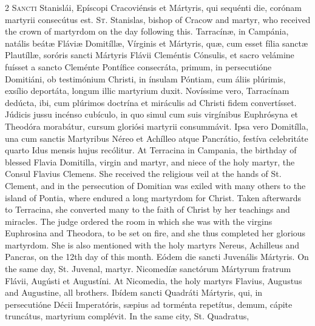 \begin{paracol}{2}
\lettrine[lines=2]{S}{ancti} Stanislái, 
 Epíscopi Cracoviénsis et Mártyris, qui sequénti die, corónam martyrii 
 consecútus est.
\switchcolumn
{}
\lettrine[lines=2]{S}{t.} Stanislas, bishop of Cracow 
 and martyr, who received the crown of martyrdom on the day following this.
\switchcolumn*
{}
Tarracínæ, in Campánia, 
 natális beátæ Fláviæ Domitíllæ, Vírginis et Mártyris, quæ, cum esset fília 
 sanctæ Plautíllæ, soróris sancti Mártyris Flávii Cleméntis Cónsulis, et 
 sacro velámine fuísset a sancto Cleménte Pontífice consecráta, primum, in 
 persecutióne Domitiáni, ob testimónium Christi, in ínsulam Póntiam, cum 
 áliis plúrimis, exsílio deportáta, longum illic martyrium duxit. 
 Novíssime vero, Tarracínam dedúcta, ibi, cum plúrimos doctrína et miráculis 
 ad Christi fidem convertísset. Júdicis jussu incénso cubículo, in quo 
 simul cum suis virgínibus Euphrósyna et Theodóra morabátur, cursum gloriósi 
 martyrii consummávit. Ipsa vero Domitílla, una cum sanctis Martyribus 
 Néreo et Achílleo atque Pancrátio, festíva celebritáte quarto Idus mensis 
 hujus recólitur.
\switchcolumn
{}
At Terracina in Campania, the 
 birthday of blessed Flavia Domitilla, virgin and martyr, and niece of the 
 holy martyr, the Consul Flavius Clemens. She received the religious 
 veil at the hands of St. Clement, and in the persecution of Domitian was exiled with many others to the island of Pontia, where endured a long 
 martyrdom for Christ. Taken afterwards to Terracina, she converted 
 many to the faith of Christ by her teachings and miracles. The judge 
 ordered the room in which she was with the virgins Euphrosina and Theodora, 
 to be set on fire, and she thus completed her glorious martyrdom. She 
 is also mentioned with the holy martyrs Nereus, Achilleus and Pancras, on 
 the 12th day of this month.
\switchcolumn*
{}
Eódem die sancti 
 Juvenális Mártyris.
\switchcolumn
{}
On the same day, St. Juvenal, 
 martyr.
\switchcolumn*
{}
Nicomedíæ sanctórum 
 Mártyrum fratrum Flávii, Augústi et Augustíni.
\switchcolumn
{}
At Nicomedia, the holy martyrs 
 Flavius, Augustus and Augustine, all brothers.
\switchcolumn*
{}
Ibídem sancti Quadráti 
 Mártyris, qui, in persecutióne Décii Imperatóris, sæpius ad torménta 
 repetítus, demum, cápite truncátus, martyrium complévit.
\switchcolumn
{}
In the same city, St. Quadratus, 

\end{paracol}
